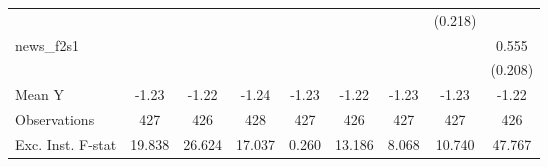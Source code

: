 {\begin{tabular}{l*{8}{c}}
            &                     &                     &                     &                     &                     &                     &     (0.218)         &                     \\
\addlinespace
news\_f2s1   &                     &                     &                     &                     &                     &                     &                     &       0.555\sym{***}\\
            &                     &                     &                     &                     &                     &                     &                     &     (0.208)         \\
\midrule
Mean Y      &       -1.23         &       -1.22         &       -1.24         &       -1.23         &       -1.22         &       -1.23         &       -1.23         &       -1.22         \\
Observations&         427         &         426         &         428         &         427         &         426         &         427         &         427         &         426         \\
Exc. Inst. F-stat&      19.838         &      26.624         &      17.037         &       0.260         &      13.186         &       8.068         &      10.740         &      47.767         \\
\bottomrule
\end{tabular}
}
